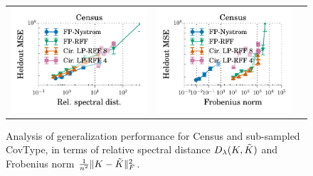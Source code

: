 \begin{figure}
\begin{tabular}{@{\hskip -0.1in}c@{\hskip -0.1in}c@{\hskip -0.1in}c@{\hskip -0.1in}}
		\includegraphics[width=0.33\linewidth]{figures/regression_l2_vs_delta.pdf} &
		\includegraphics[width=0.33\linewidth]{figures/regression_l2_vs_f_norm.pdf} %
	\end{tabular}
	\caption{Analysis of generalization performance for Census and sub-sampled CovType, in terms of relative spectral distance $D_{\lambda}(K,\tilde{K})$ and Frobenius norm $\frac{1}{n^2}\|K-\tilde{K}\|_F^2$.
	}
	\label{fig:specdist}
\end{figure}



